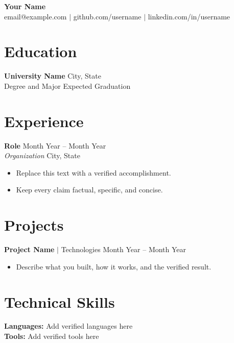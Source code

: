 \documentclass[letterpaper,11pt]{article}
\begin{document}
\begin{center}
  {\Huge\textbf{Your Name}} \\
  email@example.com $|$ github.com/username $|$ linkedin.com/in/username
\end{center}

\section{Education}
\textbf{University Name} \hfill City, State \\
Degree and Major \hfill Expected Graduation

\section{Experience}
\textbf{Role} \hfill Month Year -- Month Year \\
\textit{Organization} \hfill City, State
\begin{itemize}[leftmargin=*, nosep]
  \item Replace this text with a verified accomplishment.
  \item Keep every claim factual, specific, and concise.
\end{itemize}

\section{Projects}
\textbf{Project Name} $|$ Technologies \hfill Month Year -- Month Year
\begin{itemize}[leftmargin=*, nosep]
  \item Describe what you built, how it works, and the verified result.
\end{itemize}

\section{Technical Skills}
\textbf{Languages:} Add verified languages here \\
\textbf{Tools:} Add verified tools here
\end{document}
